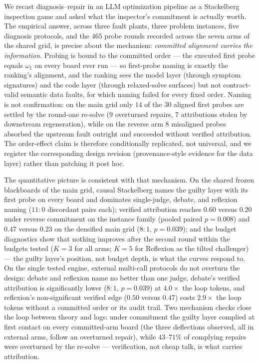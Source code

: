 \documentclass[a4paper,fleqn]{cas-sc}
\begin{document}
We recast diagnosis--repair in an LLM optimization pipeline as a
Stackelberg inspection game and asked what the inspector's commitment
is actually worth. The empirical answer, across three fault plants,
three problem instances, five diagnosis protocols, and the $465$ probe
rounds recorded across the seven arms of the shared grid, is precise
about the mechanism:
\emph{committed alignment carries the information}. Probing is bound to
the committed order --- the executed first probe equals $\omega_1$ on
every board ever run --- so first-probe naming is exactly the ranking's
alignment, and the ranking sees the model layer (through
symptom signatures) and the code layer (through relaxed-solve surfaces)
but not contract-valid semantic data faults, for which naming failed for
every fixed order. Naming is not confirmation: on the main grid only
$14$ of the $30$ aligned first probes are settled by the round-one
re-solve ($9$ overturned repairs, $7$ attributions stolen by downstream
regeneration), while on the reverse arm $8$ misaligned probes absorbed
the upstream fault outright and succeeded without verified attribution.
The order-effect claim is therefore conditionally
replicated, not universal, and we register the corresponding design
revision (provenance-style evidence for the data layer) rather than
patching it post hoc.

The quantitative picture is consistent with that mechanism. On the
shared frozen blackboards of the main grid, causal Stackelberg names
the guilty layer with its first probe on every board and dominates single-judge,
debate, and reflexion naming ($11{:}0$ discordant pairs each); verified
attribution reaches $0.60$ versus $0.20$ under reverse commitment on the
instance family (pooled paired $p=0.008$) and $0.47$ versus $0.23$ on the
densified main grid ($8{:}1$, $p=0.039$); and the budget diagnostics
show that nothing improves after the second round within the budgets
tested ($K{=}3$ for all arms; $K{=}5$ for Reflexion as the tilted
challenger) ---
the guilty layer's position, not budget depth, is what the curves
respond to. On the single tested engine, external multi-call protocols
do not overturn the design: debate and reflexion name no better than one
judge, debate's verified attribution is significantly lower
($8{:}1$, $p=0.039$) at $4.0\times$ the loop tokens, and reflexion's
non-significant verified edge ($0.50$ versus
$0.47$) costs $2.9\times$ the loop tokens without a committed order or
its audit trail. Two
mechanism checks close the loop between theory and logs: under
commitment the guilty layer complied at first contact on every
committed-arm board (the three deflections observed, all in external
arms, follow an overturned repair), while $43$--$71\%$ of complying
repairs were overturned by the re-solve --- verification, not cheap
talk, is what carries attribution.
\end{document}
